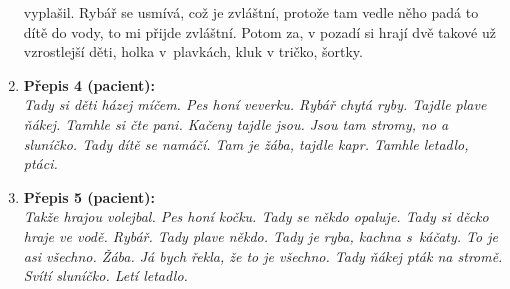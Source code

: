 \begin{enumerate}
{		      vyplašil. Rybář se usmívá, což je zvláštní, protože tam vedle něho padá to dítě do
		      vody, to mi přijde zvláštní. Potom za, v pozadí si hrají dvě takové už vzrostlejší děti, holka v plavkách, kluk
		      v tričko, šortky.}
	\item \textbf{Přepis 4 (pacient):}\\
	      \emph{Tady si děti házej míčem. Pes honí veverku. Rybář chytá ryby. Tajdle plave ňákej.
		      Tamhle si čte pani. Kačeny tajdle jsou. Jsou tam stromy, no a sluníčko. Tady dítě se
		      namáčí. Tam je žába, tajdle kapr. Tamhle letadlo, ptáci.}
	\item \textbf{Přepis 5 (pacient):}\\
	      \emph{Takže hrajou volejbal. Pes honí kočku. Tady se někdo opaluje. Tady si děcko hraje ve
		      vodě. Rybář. Tady plave někdo. Tady je ryba, kachna s káčaty. To je asi všechno. Žába.
		      Já bych řekla, že to je všechno. Tady ňákej pták na stromě. Svítí sluníčko. Letí letadlo.}
\end{enumerate}
